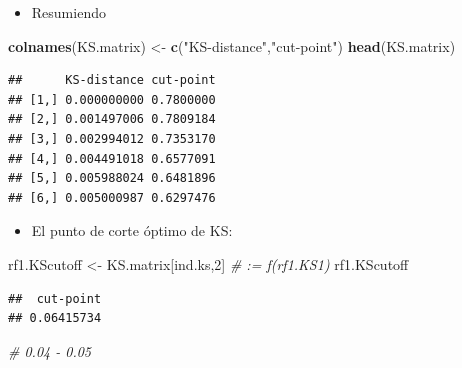 \documentclass[]{book}
\newenvironment{Shaded}{\begin{snugshade}}{\end{snugshade}}
\newcommand{\CommentTok}[1]{\textcolor[rgb]{0.56,0.35,0.01}{\textit{#1}}}
\newcommand{\DataTypeTok}[1]{\textcolor[rgb]{0.13,0.29,0.53}{#1}}
\newcommand{\DecValTok}[1]{\textcolor[rgb]{0.00,0.00,0.81}{#1}}
\newcommand{\KeywordTok}[1]{\textcolor[rgb]{0.13,0.29,0.53}{\textbf{#1}}}
\newcommand{\NormalTok}[1]{#1}
\newcommand{\OperatorTok}[1]{\textcolor[rgb]{0.81,0.36,0.00}{\textbf{#1}}}
\newcommand{\OtherTok}[1]{\textcolor[rgb]{0.56,0.35,0.01}{#1}}
\newcommand{\StringTok}[1]{\textcolor[rgb]{0.31,0.60,0.02}{#1}}
\providecommand{\tightlist}{%
  \setlength{\itemsep}{0pt}\setlength{\parskip}{0pt}}
\begin{document}
\begin{itemize}
\tightlist
\item
  Resumiendo
\end{itemize}

\begin{Shaded}
\begin{Highlighting}[]
\KeywordTok{colnames}\NormalTok{(KS.matrix) <-}\StringTok{ }\KeywordTok{c}\NormalTok{(}\StringTok{"KS-distance"}\NormalTok{,}\StringTok{"cut-point"}\NormalTok{)}
\KeywordTok{head}\NormalTok{(KS.matrix)}
\end{Highlighting}
\end{Shaded}

\begin{verbatim}
##      KS-distance cut-point
## [1,] 0.000000000 0.7800000
## [2,] 0.001497006 0.7809184
## [3,] 0.002994012 0.7353170
## [4,] 0.004491018 0.6577091
## [5,] 0.005988024 0.6481896
## [6,] 0.005000987 0.6297476
\end{verbatim}

\begin{Shaded}
\end{Shaded}

\begin{itemize}
\tightlist
\item
  El punto de corte óptimo de KS:
\end{itemize}

\begin{Shaded}
\begin{Highlighting}[]
\NormalTok{  rf1.KScutoff <-}\StringTok{ }\NormalTok{KS.matrix[ind.ks,}\DecValTok{2}\NormalTok{] }\CommentTok{# := f(rf1.KS1)}
\NormalTok{  rf1.KScutoff}
\end{Highlighting}
\end{Shaded}

\begin{verbatim}
##  cut-point 
## 0.06415734
\end{verbatim}

\begin{Shaded}
\begin{Highlighting}[]
\CommentTok{# 0.04 - 0.05 }
\end{Highlighting}
\end{Shaded}
\end{document}
